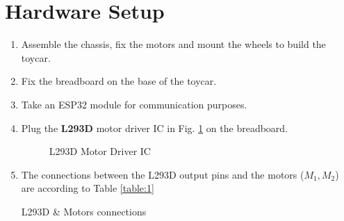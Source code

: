 \documentclass[conference]{IEEEtran}
\begin{document}
\section{Hardware Setup}
%
\begin{enumerate}[label=\thesection.\arabic*,ref=\thesection.\theenumi]

\item Assemble the chassis, fix the motors and mount the wheels to build the toycar.

\item Fix the breadboard on the base of the toycar.

\item Take an ESP32 module for communication purposes.
\item Plug the \textbf{L293D} motor driver IC in Fig. \ref{fig:l293d_ic} on the breadboard.

\begin{figure}[!ht]
\centering
{}%
\caption{L293D Motor Driver IC}
\label{fig:l293d_ic}
\end{figure}

\item The connections between the L293D output pins and the motors ($M_1, M_2$) are according to Table \ref{table:1}
\begin{table}[h!]
  \centering
  
  \caption{L293D \& Motors connections}
  \label{table:1}
\end{table}


\end{enumerate}
\end{document}
